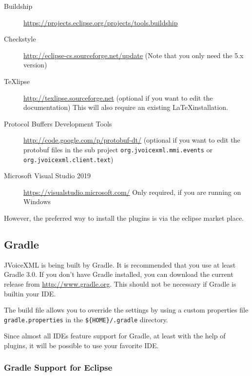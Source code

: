 \documentclass[11pt,a4paper]{article}
\begin{document}
\begin{description}
\item[Buildship] \url{https://projects.eclipse.org/projects/tools.buildship}
\item[Checkstyle] \url{http://eclipse-cs.sourceforge.net/update} (Note that you
only need the 5.x version)
\item[TeXlipse] \url{http://texlipse.sourceforge.net} (optional if you want to
edit the documentation) This will also require an existing \LaTeX installation.
\item[Protocol Buffers Development Tools] \url{http://code.google.com/p/protobuf-dt/}
(optional if you want to edit the protobuf files in the sub project
\texttt{org.jvoicexml.mmi.events} or \texttt{org.jvoicexml.client.text})
\item[Microsoft Visual Studio 2019] \url{https://visualstudio.microsoft.com/}
Only required, if you are running on Windows
\end{description}

However, the preferred way to install the plugins is via the eclipse market place.

\subsection{Gradle}
\label{sec:gradle}

JVoiceXML is being built by Gradle. It is recommended that
you use at least Gradle 3.0. 
If you don't have Gradle installed, you can download the current release
from \url{http://www.gradle.org}. This should not be necessary if Gradle is builtin
your IDE.

The build file allows you to override the settings by using a custom 
properties file \texttt{gradle.properties} in the \texttt{\$\{HOME\}/.gradle}
directory.

Since almost all IDEs feature support for Gradle, at least with the help of plugins, it will be possible to
use your favorite IDE.

\subsubsection{Gradle Support for Eclipse}
\label{sec:gradle-eclipse}
\end{document}
